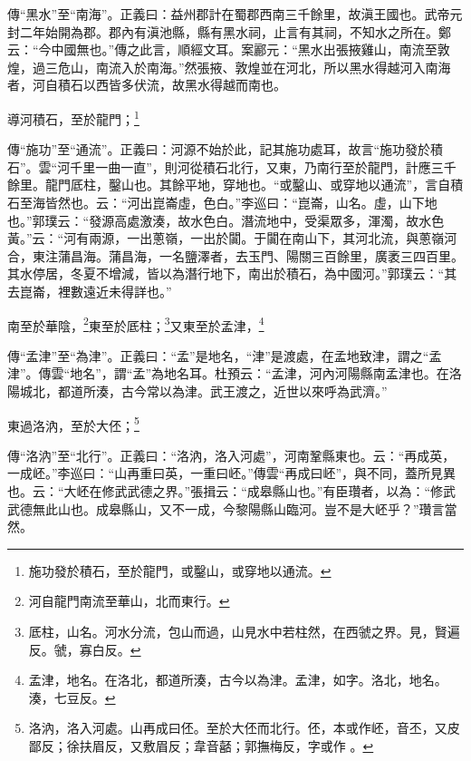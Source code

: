 {\noindent\zhuan{}\fzbyks 傳“黑水”至“南海”。正義曰：益州郡計在蜀郡西南三千餘里，故滇王國也。武帝元封二年始開為郡。郡內有滇池縣，縣有黑水祠，止言有其祠，不知水之所在。鄭云：“今中國無也。”傳之此言，順經文耳。案酈元：“黑水出張掖雞山，南流至敦煌，過三危山，南流入於南海。”然張掖、敦煌並在河北，所以黑水得越河入南海者，河自積石以西皆多伏流，故黑水得越而南也。 \par}

導河積石，至於龍門；\footnote{施功發於積石，至於龍門，或鑿山，或穿地以通流。}

{\noindent\zhuan{}\fzbyks 傳“施功”至“通流”。正義曰：河源不始於此，記其施功處耳，故言“施功發於積石”。雲“河千里一曲一直”，則河從積石北行，又東，乃南行至於龍門，計應三千餘里。龍門厎柱，鑿山也。其餘平地，穿地也。“或鑿山、或穿地以通流”，言自積石至海皆然也。云：“河出崑崙虛，色白。”李巡曰：“崑崙，山名。虛，山下地也。”郭璞云：“發源高處激湊，故水色白。潛流地中，受渠眾多，渾濁，故水色黃。”云：“河有兩源，一出蔥嶺，一出於闐。于闐在南山下，其河北流，與蔥嶺河合，東注蒲昌海。蒲昌海，一名鹽澤者，去玉門、陽關三百餘里，廣袤三四百里。其水停居，冬夏不增減，皆以為潛行地下，南出於積石，為中國河。”郭璞云：“其去崑崙，裡數遠近未得詳也。” \par}

南至於華陰，\footnote{河自龍門南流至華山，北而東行。}東至於厎柱；\footnote{厎柱，山名。河水分流，包山而過，山見水中若柱然，在西虢之界。見，賢遍反。虢，寡白反。}又東至於孟津，\footnote{孟津，地名。在洛北，都道所湊，古今以為津。孟津，如字。洛北，地名。湊，七豆反。}

{\noindent\zhuan{}\fzbyks 傳“孟津”至“為津”。正義曰：“孟”是地名，“津”是渡處，在孟地致津，謂之“孟津”。傳雲“地名”，謂“孟”為地名耳。杜預云：“孟津，河內河陽縣南孟津也。在洛陽城北，都道所湊，古今常以為津。武王渡之，近世以來呼為武濟。” \par}

東過洛汭，至於大伾；\footnote{洛汭，洛入河處。山再成曰伾。至於大伾而北行。伾，本或作岯，音丕，又皮鄙反；徐扶眉反，又敷眉反；韋音嚭；郭撫梅反，字或作 。}

{\noindent\zhuan{}\fzbyks 傳“洛汭”至“北行”。正義曰：“洛汭，洛入河處”，河南鞏縣東也。云：“再成英，一成岯。”李巡曰：“山再重曰英，一重曰岯。”傳雲“再成曰岯”，與不同，蓋所見異也。云：“大岯在修武武德之界。”張揖云：“成皋縣山也。”有臣瓚者，以為：“修武武德無此山也。成皋縣山，又不一成，今黎陽縣山臨河。豈不是大岯乎？”瓚言當然。 \par}

